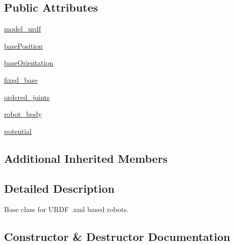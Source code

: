 \subsection*{Public Attributes}
\begin{DoxyCompactItemize}
\item 
\hyperlink{classpybullet-gym_1_1pybulletgym_1_1envs_1_1mujoco_1_1robots_1_1robot__bases_1_1_u_r_d_f_based_robot_a446f034a7e28dbd1accefc3ff7e71e47}{model\+\_\+urdf}
\item 
\hyperlink{classpybullet-gym_1_1pybulletgym_1_1envs_1_1mujoco_1_1robots_1_1robot__bases_1_1_u_r_d_f_based_robot_a57ee0e5367c52400815e123044f1e66c}{base\+Position}
\item 
\hyperlink{classpybullet-gym_1_1pybulletgym_1_1envs_1_1mujoco_1_1robots_1_1robot__bases_1_1_u_r_d_f_based_robot_aa455511ea013c978d3c5c46953c14a7c}{base\+Orientation}
\item 
\hyperlink{classpybullet-gym_1_1pybulletgym_1_1envs_1_1mujoco_1_1robots_1_1robot__bases_1_1_u_r_d_f_based_robot_a6255189859ef7a63dd6f6dfacbdf7c80}{fixed\+\_\+base}
\item 
\hyperlink{classpybullet-gym_1_1pybulletgym_1_1envs_1_1mujoco_1_1robots_1_1robot__bases_1_1_u_r_d_f_based_robot_a2f795c71604f8bfbb682e72433db6a5b}{ordered\+\_\+joints}
\item 
\hyperlink{classpybullet-gym_1_1pybulletgym_1_1envs_1_1mujoco_1_1robots_1_1robot__bases_1_1_u_r_d_f_based_robot_a089de661bf8e75dd14bac8960280f547}{robot\+\_\+body}
\item 
\hyperlink{classpybullet-gym_1_1pybulletgym_1_1envs_1_1mujoco_1_1robots_1_1robot__bases_1_1_u_r_d_f_based_robot_a185704858da885fab64145b72510b205}{potential}
\end{DoxyCompactItemize}
\subsection*{Additional Inherited Members}


\subsection{Detailed Description}
\begin{DoxyVerb}Base class for URDF .xml based robots.
\end{DoxyVerb}
 

\subsection{Constructor \& Destructor Documentation}
